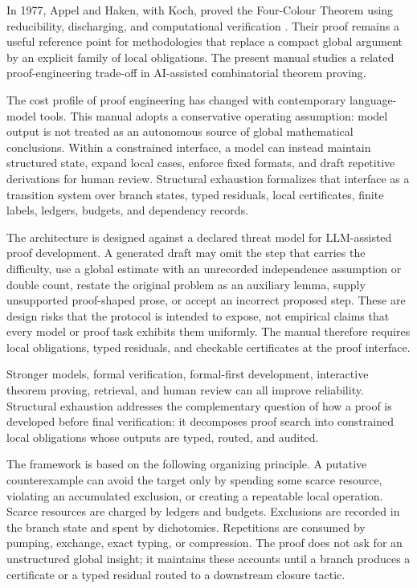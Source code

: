 \documentclass[
  11pt,
]{article}
\theoremstyle{definition}
\begin{document}
In 1977, Appel and Haken, with Koch, proved the Four-Colour Theorem using
reducibility, discharging, and computational verification
\citep{appel-haken-1977-discharging,appel-haken-koch-1977-reducibility}.
Their proof remains a useful reference point for methodologies that
replace a compact global argument by an explicit family of local
obligations. The present manual studies a related proof-engineering
trade-off in AI-assisted combinatorial theorem proving.

The cost profile of proof engineering has changed with contemporary
language-model tools. This manual adopts a conservative operating
assumption: model output is not treated as an autonomous source of global
mathematical conclusions. Within a constrained interface, a model can
instead maintain structured state, expand local cases, enforce fixed
formats, and draft repetitive derivations for human review. Structural
exhaustion formalizes that interface as a transition system over branch
states, typed residuals, local certificates, finite labels, ledgers,
budgets, and dependency records.

The architecture is designed against a declared threat model for
LLM-assisted proof development. A generated draft may omit the step that
carries the difficulty, use a global estimate with an unrecorded
independence assumption or double count, restate the original problem as
an auxiliary lemma, supply unsupported proof-shaped prose, or accept an
incorrect proposed step. These are design risks that the protocol is
intended to expose, not empirical claims that every model or proof task
exhibits them uniformly. The manual therefore requires local obligations,
typed residuals, and checkable certificates at the proof interface.

Stronger models, formal verification, formal-first development,
interactive theorem proving, retrieval, and human review can all improve
reliability. Structural exhaustion addresses the complementary question
of how a proof is developed before final verification: it decomposes
proof search into constrained local obligations whose outputs are typed,
routed, and audited.

The framework is based on the following organizing principle. A putative
counterexample can avoid the target only by spending some scarce
resource, violating an accumulated exclusion, or creating a repeatable
local operation. Scarce resources are charged by ledgers and budgets.
Exclusions are recorded in the branch state and spent by dichotomies.
Repetitions are consumed by pumping, exchange, exact typing, or
compression. The proof does not ask for an unstructured global insight;
it maintains these accounts until a branch produces a certificate or a
typed residual routed to a downstream closure tactic.
\end{document}
